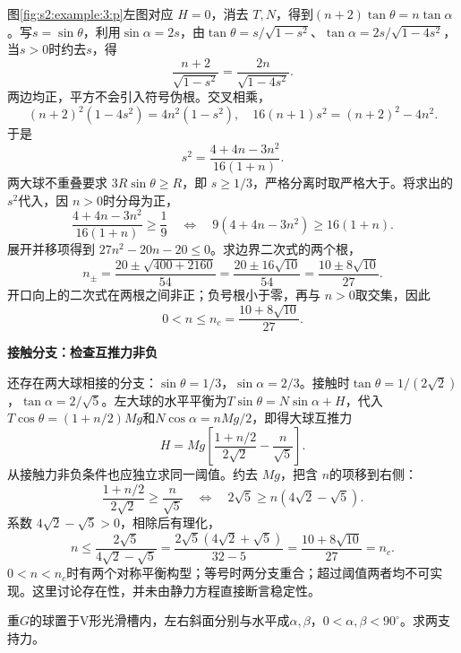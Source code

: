 \begin{solution}
图\ref{fig:s2:example:3:p}左图对应 $H=0$，消去 $T,N$，得到$(n+2)\tan\theta=n\tan\alpha$。写$s=\sin\theta$，利用$\sin\alpha=2s$，由$\tan\theta=s/\sqrt{1-s^2}$、$\tan\alpha=2s/\sqrt{1-4s^2}$，当$s>0$时约去$s$，得
\[
\frac{n+2}{\sqrt{1-s^2}}=\frac{2n}{\sqrt{1-4s^2}}.
\]
两边均正，平方不会引入符号伪根。交叉相乘，
\[
(n+2)^2(1-4s^2)=4n^2(1-s^2),
\quad 16(n+1)s^2=(n+2)^2-4n^2.
\]
于是
\[
s^2=\frac{4+4n-3n^2}{16(1+n)}.
\]
两大球不重叠要求 $3R\sin\theta\ge R$，即 $s\ge1/3$，严格分离时取严格大于。将求出的 $s^2$代入，因 $n>0$时分母为正，
\[
 \frac{4+4n-3n^2}{16(1+n)}\ge\frac19
 \quad\Longleftrightarrow\quad
 9(4+4n-3n^2)\ge16(1+n).
\]
展开并移项得到 $27n^2-20n-20\le0$。求边界二次式的两个根，
\[
 n_{\pm}=\frac{20\pm\sqrt{400+2160}}{54}
 =\frac{20\pm16\sqrt{10}}{54}
 =\frac{10\pm8\sqrt{10}}{27}.
\]
开口向上的二次式在两根之间非正；负号根小于零，再与 $n>0$取交集，因此
\[
0<n\le n_c=\frac{10+8\sqrt{10}}{27}.
\]



\par\medskip{}\noindent\textbf{接触分支：检查互推力非负}\par\nobreak
还存在两大球相接的分支：$\sin\theta=1/3$，$\sin\alpha=2/3$。接触时$\tan\theta=1/(2\sqrt2)$，$\tan\alpha=2/\sqrt5$。左大球的水平平衡为$T\sin\theta=N\sin\alpha+H$，代入$T\cos\theta=(1+n/2)Mg$和$N\cos\alpha=nMg/2$，即得大球互推力
\[
H=Mg\left[\frac{1+n/2}{2\sqrt2}-\frac n{\sqrt5}\right].
\]
从接触力非负条件也应独立求同一阈值。约去 $Mg$，把含 $n$的项移到右侧：
\[
 \frac{1+n/2}{2\sqrt2}\ge\frac n{\sqrt5}
 \quad\Longleftrightarrow\quad
 2\sqrt5\ge n(4\sqrt2-\sqrt5).
\]
系数 $4\sqrt2-\sqrt5>0$，相除后有理化，
\[
 n\le\frac{2\sqrt5}{4\sqrt2-\sqrt5}
 =\frac{2\sqrt5(4\sqrt2+\sqrt5)}{32-5}
 =\frac{10+8\sqrt{10}}{27}=n_c.
\]
$0<n<n_c$时有两个对称平衡构型；等号时两分支重合；超过阈值两者均不可实现。这里讨论存在性，并未由静力方程直接断言稳定性。\end{solution}
\begin{question}\begin{example}[两光滑斜面之间的球]\label{s2:example:4}
重$G$的球置于V形光滑槽内，左右斜面分别与水平成$\alpha,\beta$，$0<\alpha,\beta<90^\circ$。求两支持力。
\end{example}
\end{question}
